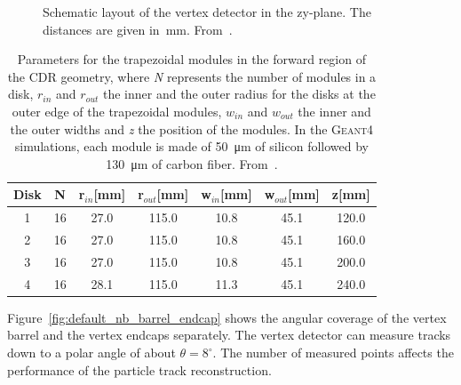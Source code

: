 \begin{figure}[H]
  \caption{Schematic layout of the vertex detector in the zy-plane. The distances are given in~mm. From~\cite{Grefe2011}.}
  \label{fig:endcap_placement}
\end{figure}


\begin{table}[H]
  \caption{Parameters for the trapezoidal modules in the forward region
    of the CDR geometry, where \textit{N} represents the number of modules
    in a disk, $r_{in}$ and $r_{out}$ the inner and the outer radius
    for the disks at the outer edge of the trapezoidal modules, $w_{in}$ and $w_{out}$ the inner and the outer
    widths and \textit{z} the position of the modules. In the \textsc{Geant4} simulations, each
    module is made of \SI{50}{\micro\meter} of silicon followed by
    \SI{130}{\micro\meter} of carbon fiber. From~\cite{Grefe2011}.}
  \begin{center}
    \begin{tabular}{ c c c c c c c }
      \hline
      Disk & N & r$_{in}$[mm] & r$_{out}$[mm] & w$_{in}$[mm] & w$_{out}$[mm] & z[mm] \\ \hline \hline
      1 & 16 & 27.0 & 115.0 & 10.8 & 45.1 & 120.0 \\ \hline
      2 & 16 & 27.0 & 115.0 & 10.8 & 45.1 & 160.0 \\ \hline
      3 & 16 & 27.0 & 115.0 & 10.8 & 45.1 & 200.0 \\ \hline
      4 & 16 & 28.1 & 115.0 & 11.3 & 45.1 & 240.0\\ \hline
    \end{tabular}
  \end{center}
  \label{tab:params_default_endcap}
\end{table}

Figure~\ref{fig:default_nb_barrel_endcap} shows the angular coverage of the vertex barrel and the vertex endcaps separately. The vertex detector can measure tracks down to a polar angle of about $\theta = 8^\circ$. The number of measured points affects the performance of the particle track reconstruction. 

